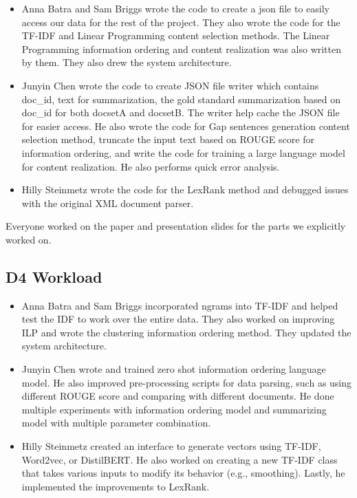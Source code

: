 \begin{itemize}
    \item Anna Batra and Sam Briggs wrote the code to create a json file to easily access our data for the rest of the project. They also wrote the code for the TF-IDF and Linear Programming content selection methods. The Linear Programming information ordering and content realization was also written by them. They also drew the system architecture.

    \item Junyin Chen wrote the code to create JSON file writer which contains doc\_id, text for summarization, the gold standard summarization based on doc\_id for both docsetA and docsetB. The writer help cache the JSON file for easier access. He also wrote the code for Gap sentences generation content selection method, truncate the input text based on ROUGE score for information ordering, and write the code for training a large language model for content realization. He also performs quick error analysis.

    \item Hilly Steinmetz wrote the code for the LexRank method and debugged issues with the original XML document parser.
    
\end{itemize}

Everyone worked on the paper and presentation slides for the parts we explicitly worked on.

\subsection{D4 Workload}

\begin{itemize}
    \item Anna Batra and Sam Briggs incorporated ngrams into TF-IDF and helped test the IDF to work over the entire data. They also worked on improving ILP and wrote the clustering information ordering method. They updated the system architecture.

    \item Junyin Chen wrote and trained zero shot information ordering language model. He also improved pre-processing scripts for data parsing, such as using different ROUGE score and comparing with different documents. He done multiple experiments with information ordering model and summarizing model with multiple parameter combination.

    \item Hilly Steinmetz created an interface to generate vectors using TF-IDF, Word2vec, or DistilBERT. He also worked on creating a new TF-IDF class that takes various inputs to modify its behavior (e.g., smoothing). Lastly, he implemented the improvements to LexRank.
    
\end{itemize}

